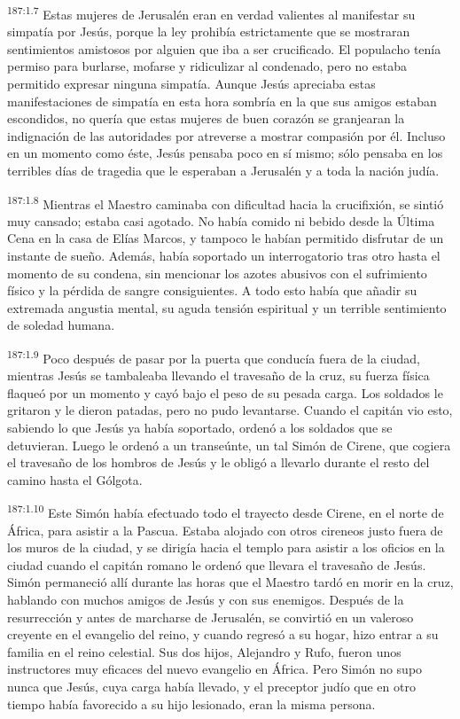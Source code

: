 \par 
\textsuperscript{187:1.7} Estas mujeres de Jerusalén eran en verdad valientes al manifestar su simpatía por Jesús, porque la ley prohibía estrictamente que se mostraran sentimientos amistosos por alguien que iba a ser crucificado. El populacho tenía permiso para burlarse, mofarse y ridiculizar al condenado, pero no estaba permitido expresar ninguna simpatía. Aunque Jesús apreciaba estas manifestaciones de simpatía en esta hora sombría en la que sus amigos estaban escondidos, no quería que estas mujeres de buen corazón se granjearan la indignación de las autoridades por atreverse a mostrar compasión por él. Incluso en un momento como éste, Jesús pensaba poco en sí mismo; sólo pensaba en los terribles días de tragedia que le esperaban a Jerusalén y a toda la nación judía.

\par 
\textsuperscript{187:1.8} Mientras el Maestro caminaba con dificultad hacia la crucifixión, se sintió muy cansado; estaba casi agotado. No había comido ni bebido desde la Última Cena en la casa de Elías Marcos, y tampoco le habían permitido disfrutar de un instante de sueño. Además, había soportado un interrogatorio tras otro hasta el momento de su condena, sin mencionar los azotes abusivos con el sufrimiento físico y la pérdida de sangre consiguientes. A todo esto había que añadir su extremada angustia mental, su aguda tensión espiritual y un terrible sentimiento de soledad humana.

\par 
\textsuperscript{187:1.9} Poco después de pasar por la puerta que conducía fuera de la ciudad, mientras Jesús se tambaleaba llevando el travesaño de la cruz, su fuerza física flaqueó por un momento y cayó bajo el peso de su pesada carga. Los soldados le gritaron y le dieron patadas, pero no pudo levantarse. Cuando el capitán vio esto, sabiendo lo que Jesús ya había soportado, ordenó a los soldados que se detuvieran. Luego le ordenó a un transeúnte, un tal Simón de Cirene, que cogiera el travesaño de los hombros de Jesús y le obligó a llevarlo durante el resto del camino hasta el Gólgota.

\par 
\textsuperscript{187:1.10} Este Simón había efectuado todo el trayecto desde Cirene, en el norte de África, para asistir a la Pascua. Estaba alojado con otros cireneos justo fuera de los muros de la ciudad, y se dirigía hacia el templo para asistir a los oficios en la ciudad cuando el capitán romano le ordenó que llevara el travesaño de Jesús. Simón permaneció allí durante las horas que el Maestro tardó en morir en la cruz, hablando con muchos amigos de Jesús y con sus enemigos. Después de la resurrección y antes de marcharse de Jerusalén, se convirtió en un valeroso creyente en el evangelio del reino, y cuando regresó a su hogar, hizo entrar a su familia en el reino celestial. Sus dos hijos, Alejandro y Rufo, fueron unos instructores muy eficaces del nuevo evangelio en África. Pero Simón no supo nunca que Jesús, cuya carga había llevado, y el preceptor judío que en otro tiempo había favorecido a su hijo lesionado, eran la misma persona.


